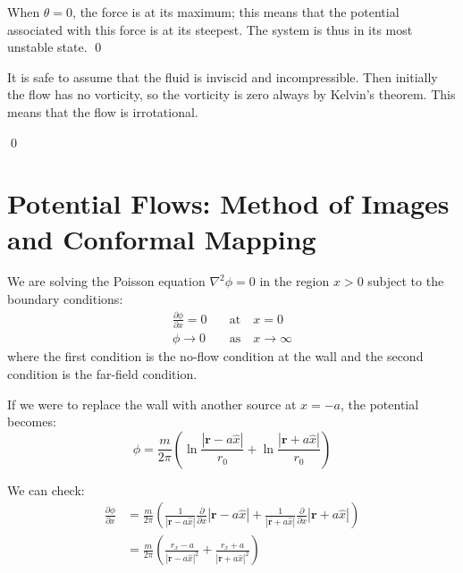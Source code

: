 \documentclass[12pt]{article}
\begin{document}
When $\theta = 0$, the force is at its maximum; this means that the potential associated with this force is at its steepest. The system is thus in its most unstable state.
\qed



It is safe to assume that the fluid is inviscid and incompressible. Then initially the flow has no vorticity, so the vorticity is zero always by Kelvin's theorem. This means that the flow is irrotational.


\qed


\pagebreak
\section*{Potential Flows: Method of Images and Conformal Mapping}



We are solving the Poisson equation $\nabla^{2} \phi = 0$ in the region $x > 0$ subject to the boundary conditions:
\begin{equation}
    \begin{split}
        \frac{\partial \phi}{\partial x} = 0 \quad &\text{at} \quad x = 0 \\
        \phi \to 0 \quad &\text{as} \quad x \to \infty
    \end{split}
\end{equation}
where the first condition is the no-flow condition at the wall and the second condition is the far-field condition.

If we were to replace the wall with another source at $x = -a$, the potential becomes:
\begin{equation}
    \phi = \frac{m}{2\pi} \left( \ln{\frac{\left\lvert \mathbf{r} - a \hat{x} \right\rvert}{r_{0}}} + \ln{\frac{\left\lvert \mathbf{r} + a \hat{x} \right\rvert}{r_{0}}} \right)
\end{equation}

We can check:
\begin{equation}
    \begin{split}
        \frac{\partial \phi}{\partial x} &= \frac{m}{2\pi} \left( \frac{1}{\left\lvert \mathbf{r} - a \hat{x} \right\rvert} \frac{\partial}{\partial x} \left\lvert \mathbf{r} - a \hat{x} \right\rvert + \frac{1}{\left\lvert \mathbf{r} + a \hat{x} \right\rvert} \frac{\partial}{\partial x} \left\lvert \mathbf{r} + a \hat{x} \right\rvert \right) \\
        &= \frac{m}{2\pi} \left( \frac{r_{x} - a}{\left\lvert \mathbf{r} - a \hat{x} \right\rvert^{2}} + \frac{r_{x} + a}{\left\lvert \mathbf{r} + a \hat{x} \right\rvert^{2}} \right) \\
    \end{split}
\end{equation}
\end{document}
